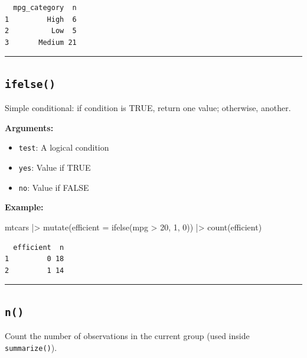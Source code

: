 \documentclass[
  letterpaper,
  DIV=11,
  numbers=noendperiod]{scrreprt}
\newenvironment{Shaded}{\begin{snugshade}}{\end{snugshade}}
\newcommand{\AttributeTok}[1]{\textcolor[rgb]{0.40,0.45,0.13}{#1}}
\newcommand{\DecValTok}[1]{\textcolor[rgb]{0.68,0.00,0.00}{#1}}
\newcommand{\FunctionTok}[1]{\textcolor[rgb]{0.28,0.35,0.67}{#1}}
\newcommand{\NormalTok}[1]{\textcolor[rgb]{0.00,0.23,0.31}{#1}}
\newcommand{\SpecialCharTok}[1]{\textcolor[rgb]{0.37,0.37,0.37}{#1}}
\providecommand{\tightlist}{%
  \setlength{\itemsep}{0pt}\setlength{\parskip}{0pt}}
\begin{document}
\begin{verbatim}
  mpg_category  n
1         High  6
2          Low  5
3       Medium 21
\end{verbatim}

\begin{center}\rule{0.5\linewidth}{0.5pt}\end{center}

\subsection{\texorpdfstring{\texttt{ifelse()}}{ifelse()}}\label{ifelse}

Simple conditional: if condition is TRUE, return one value; otherwise,
another.

\textbf{Arguments:}

\begin{itemize}
\tightlist
\item
  \texttt{test}: A logical condition
\item
  \texttt{yes}: Value if TRUE
\item
  \texttt{no}: Value if FALSE
\end{itemize}

\textbf{Example:}

\begin{Shaded}
\begin{Highlighting}[]
\NormalTok{mtcars }\SpecialCharTok{|\textgreater{}}
  \FunctionTok{mutate}\NormalTok{(}\AttributeTok{efficient =} \FunctionTok{ifelse}\NormalTok{(mpg }\SpecialCharTok{\textgreater{}} \DecValTok{20}\NormalTok{, }\DecValTok{1}\NormalTok{, }\DecValTok{0}\NormalTok{)) }\SpecialCharTok{|\textgreater{}}
  \FunctionTok{count}\NormalTok{(efficient)}
\end{Highlighting}
\end{Shaded}

\begin{verbatim}
  efficient  n
1         0 18
2         1 14
\end{verbatim}

\begin{center}\rule{0.5\linewidth}{0.5pt}\end{center}

\subsection{\texorpdfstring{\texttt{n()}}{n()}}\label{n}

Count the number of observations in the current group (used inside
\texttt{summarize()}).
\end{document}
